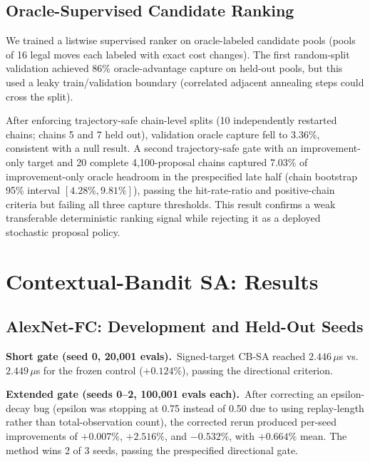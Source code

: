 \documentclass[10pt,conference]{IEEEtran}
\begin{document}
\subsection{Oracle-Supervised Candidate Ranking}

We trained a listwise supervised ranker on oracle-labeled candidate pools
(pools of 16 legal moves each labeled with exact cost changes).  The first
random-split validation achieved 86\% oracle-advantage capture on held-out
pools, but this used a leaky train/validation boundary (correlated adjacent
annealing steps could cross the split).

After enforcing trajectory-safe chain-level splits (10 independently restarted
chains; chains 5 and 7 held out), validation oracle capture fell to 3.36\%,
consistent with a null result.  A second trajectory-safe gate with an
improvement-only target and 20 complete 4,100-proposal chains captured 7.03\%
of improvement-only oracle headroom in the prespecified late half (chain
bootstrap 95\% interval $[4.28\%, 9.81\%]$), passing the hit-rate-ratio and
positive-chain criteria but failing all three capture thresholds.  This result
confirms a weak transferable deterministic ranking signal while
rejecting it as a deployed stochastic proposal policy.

\section{Contextual-Bandit SA: Results}
\label{sec:results}

\subsection{AlexNet-FC: Development and Held-Out Seeds}

\textbf{Short gate (seed 0, 20,001 evals).}\
Signed-target CB-SA reached $2.446\,\mu$s vs.\ $2.449\,\mu$s for the frozen
control ($+0.124\%$), passing the directional criterion.

\textbf{Extended gate (seeds 0--2, 100,001 evals each).}\
After correcting an epsilon-decay bug (epsilon was stopping at 0.75 instead of
0.50 due to using replay-length rather than total-observation count), the
corrected rerun produced per-seed improvements of $+0.007\%$, $+2.516\%$, and
$-0.532\%$, with $+0.664\%$ mean.  The method wins 2 of 3 seeds, passing the
prespecified directional gate.
\end{document}
